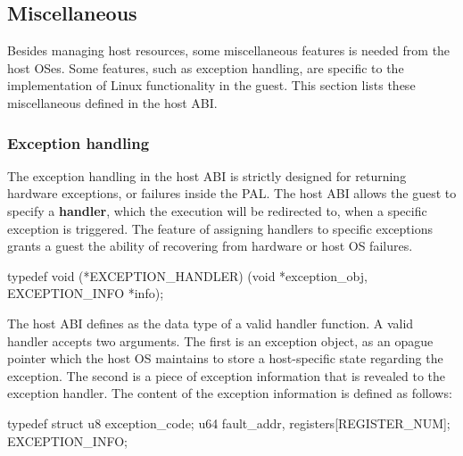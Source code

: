 \subsection{Miscellaneous}
\label{sec:abi:misc}


Besides managing host resources, 
some miscellaneous features is needed from the host OSes.
Some features, such as exception handling, are specific to the implementation of Linux functionality
in the guest.
This section lists these miscellaneous \hostapis{} defined in the host ABI.



\subsubsection*{Exception handling}



The exception handling in the host ABI
is strictly designed for returning hardware exceptions,
or failures inside the PAL.
The host ABI allows the guest to specify a {\bf handler},
which the execution will be redirected to, when a specific exception is triggered.
The feature of assigning handlers to specific exceptions
grants a guest the ability of recovering from hardware or host OS failures.




\begin{paldef}
typedef void (*EXCEPTION_HANDLER)
            (void *exception_obj, EXCEPTION_INFO *info);
\end{paldef}



The host ABI defines  as the data type of a valid handler function.
A valid handler accepts two arguments.
The first is an exception object, as an opague pointer
which the host OS maintains to store a host-specific state regarding the exception.
The second is a piece of exception information that
is revealed to the exception handler.
The content of the exception information is defined as follows:

\begin{paldef}
typedef struct {
    u8  exception_code;
    u64 fault_addr, registers[REGISTER_NUM];
} EXCEPTION_INFO;
\end{paldef}

